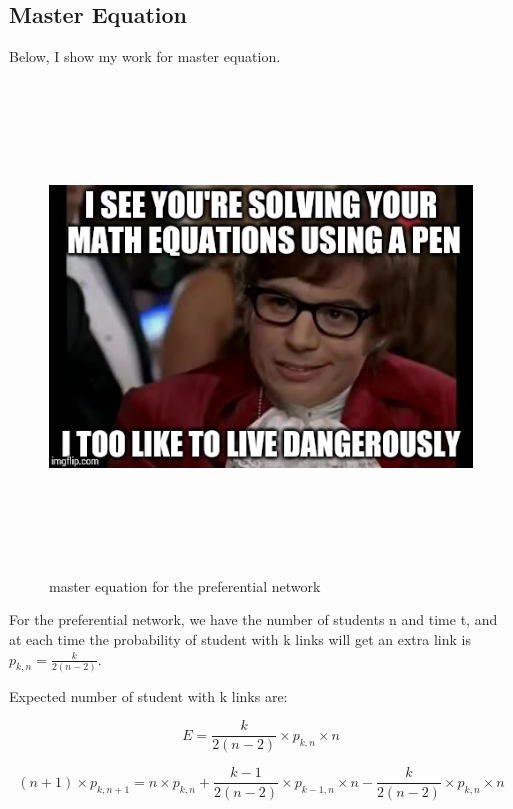 \documentclass[12pt]{article}
\begin{document}
\newpage
\subsection{Master Equation}

Below, I show my work for master equation. 

\begin{figure}[H] %
\centering
\includegraphics[width = 16 cm, height = 13cm]{dange.jpg}
\caption{master equation for the preferential network}
\label{fig:me3_4}
\end{figure}

\newpage

For the preferential network, we have the number of students n and time t, and at each time the probability of student with k links will get an extra link is $p_{k,n} = \frac{k}{2(n-2)}$. \par

Expected number of student with k links are:

\begin{equation}
	E = \frac{k}{2(n-2)} \times p_{k,n} \times n
\end{equation}


\begin{equation}
	(n+1)\times p_{k,n+1} = n \times p_{k,n} + \frac{k-1}{2(n-2)} \times p_{k-1,n} \times n - \frac{k}{2(n-2)} \times p_{k,n} \times n
\end{equation}
\end{document}
